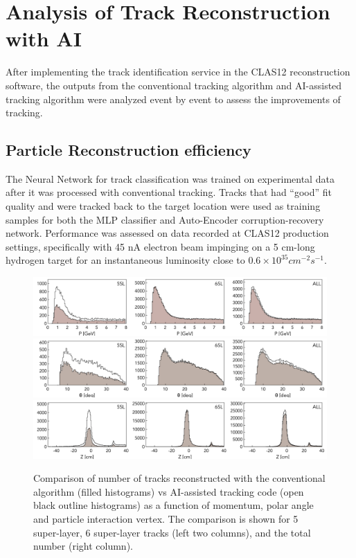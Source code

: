 \section{Analysis of Track Reconstruction with AI}

After implementing the track identification service in the CLAS12 
reconstruction software, the outputs from the conventional tracking 
algorithm and AI-assisted tracking algorithm were analyzed event by 
event to assess the improvements of tracking. 
 
 \subsection{Particle Reconstruction efficiency}
 
 The Neural Network for track classification was trained on experimental 
 data after it was processed with conventional tracking. Tracks that had ``good'' 
 fit quality and were tracked back to the target location were used as training 
 samples for both the MLP classifier and Auto-Encoder corruption-recovery network. 
 Performance was assessed on data recorded at CLAS12 production settings, 
 specifically with 45 nA electron beam impinging on a 5 cm-long hydrogen target 
 for an instantaneous luminosity close to $0.6\times10^{35} cm^{-2} s^{-1}$.

 \begin{figure}[!ht]
\begin{center}
  \includegraphics[width=6.5in]{images/figure_p.pdf}
  \includegraphics[width=6.5in]{images/figure_theta.pdf}
    \includegraphics[width=6.5in]{images/figure_vz.pdf}
\caption { Comparison of number of tracks reconstructed with the conventional 
algorithm (filled histograms) vs AI-assisted tracking code (open black outline 
histograms) as a function of momentum, polar angle and particle interaction vertex. 
The comparison is shown for 5 super-layer, 6 super-layer tracks (left two columns), 
and the total number (right column).}
 \label{track:efficiency}
 \end{center}
\end{figure}

